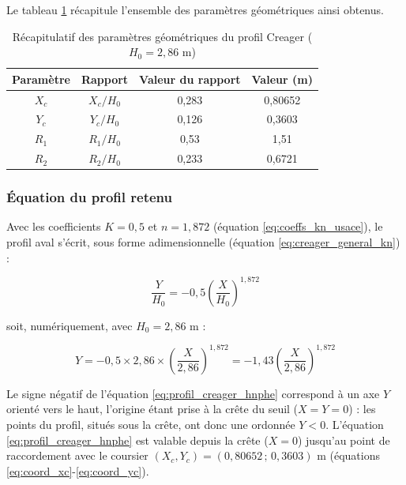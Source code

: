 Le tableau \ref{tab:recap_profil_usace} récapitule l'ensemble des paramètres géométriques ainsi obtenus.

\begin{table}[H]
    \centering
    \caption{Récapitulatif des paramètres géométriques du profil Creager ($H_0=2{,}86$ m)}
    \label{tab:recap_profil_usace}
    \begin{tabular}{|c|c|c|c|}
        \hline
        \textbf{Paramètre} & \textbf{Rapport} & \textbf{Valeur du rapport} & \textbf{Valeur (m)} \\
        \hline
        $X_c$ & $X_c/H_0$ & 0,283 & 0,80652 \\
        \hline
        $Y_c$ & $Y_c/H_0$ & 0,126 & 0,3603 \\
        \hline
        $R_1$ & $R_1/H_0$ & 0,53 & 1,51 \\
        \hline
        $R_2$ & $R_2/H_0$ & 0,233 & 0,6721 \\
        \hline
    \end{tabular}
\end{table}

\subsubsection{Équation du profil retenu}
\label{subsubsec:equation_profil_usace}

Avec les coefficients $K=0{,}5$ et $n=1{,}872$ (équation \ref{eq:coeffs_kn_usace}), le profil aval s'écrit, sous forme adimensionnelle (équation \ref{eq:creager_general_kn}) :

\begin{equation}
\frac{Y}{H_0} = -0{,}5 \left(\frac{X}{H_0}\right)^{1{,}872}
\label{eq:profil_creager_hnphe_forme}
\end{equation}

soit, numériquement, avec $H_0=2{,}86$ m :

\begin{equation}
Y = -0{,}5 \times 2{,}86 \times \left(\frac{X}{2{,}86}\right)^{1{,}872} = -1{,}43 \left(\frac{X}{2{,}86}\right)^{1{,}872}
\label{eq:profil_creager_hnphe}
\end{equation}

Le signe négatif de l'équation \ref{eq:profil_creager_hnphe} correspond à un axe $Y$ orienté vers le haut, l'origine étant prise à la crête du seuil ($X=Y=0$) : les points du profil, situés sous la crête, ont donc une ordonnée $Y<0$. L'équation \ref{eq:profil_creager_hnphe} est valable depuis la crête ($X=0$) jusqu'au point de raccordement avec le coursier $(X_c,Y_c) = (0{,}80652\,;\,0{,}3603)$ m (équations \ref{eq:coord_xc}-\ref{eq:coord_yc}).

